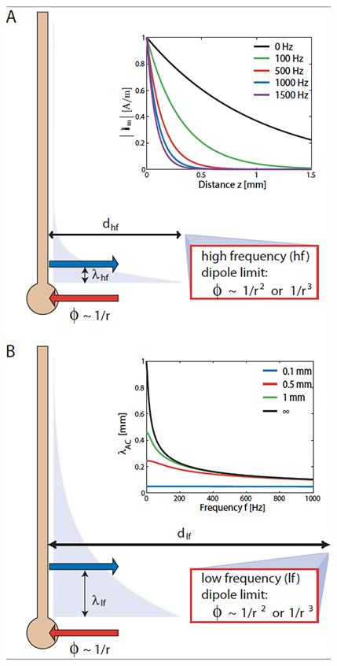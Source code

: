 
\begin{figure}[!ht]
\begin{center}
\includegraphics{Figures/Spikes/Spikes-ball-and-stick-sketch-w70-r150}

\end{center}
\end{figure}
